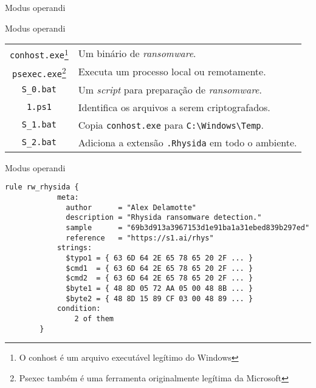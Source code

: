\documentclass[bookmarks=false,aspectratio=169,9pt]{beamer}
\begin{document}
\begin{frame}{Modus operandi}
\begin{figure}[!ht]
\centering
{}
\end{figure}
\end{frame}
\begin{frame}[fragile]{Modus operandi}
\begin{center}
\begin{tabular}{c|p{9cm}}
			\verb|conhost.exe|\footnote{O conhost é um arquivo executável legítimo do Windows} & Um binário de \textit{ransomware}. \\
			\verb|psexec.exe|\footnote{Psexec também é uma ferramenta originalmente legítima da Microsoft} & Executa um processo local ou remotamente. \\
			\verb|S_0.bat|     & Um \textit{script} para preparação de \textit{ransomware}.\\
			\verb|1.ps1|       & Identifica os arquivos a serem criptografados.\\
			\verb|S_1.bat|     & Copia \verb|conhost.exe| para \verb|C:\Windows\Temp|.\\
			\verb|S_2.bat|     & Adiciona a extensão \verb|.Rhysida| em todo o ambiente.
		\end{tabular}
\end{center}
\end{frame}
\begin{frame}[fragile]{Modus operandi}
\begin{center}
\begin{lstlisting}[caption=Regras YARA fornecidas pela equipe do SentinelOne]
        rule rw_rhysida {
            meta:
              author      = "Alex Delamotte"
              description = "Rhysida ransomware detection."
              sample      = "69b3d913a3967153d1e91ba1a31ebed839b297ed"
              reference   = "https://s1.ai/rhys"
            strings:
              $typo1 = { 63 6D 64 2E 65 78 65 20 2F ... }
              $cmd1  = { 63 6D 64 2E 65 78 65 20 2F ... }
              $cmd2  = { 63 6D 64 2E 65 78 65 20 2F ... }
              $byte1 = { 48 8D 05 72 AA 05 00 48 8B ... }
              $byte2 = { 48 8D 15 89 CF 03 00 48 89 ... }
            condition:
                2 of them
        }
\end{lstlisting}
\end{center}
\end{frame}
\end{document}
